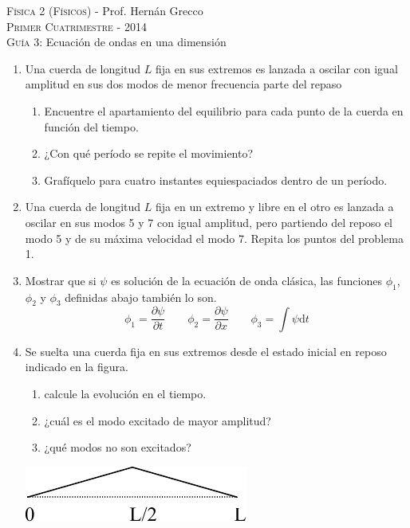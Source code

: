 \documentclass[11pt,spanish,a4paper]{article}
\begin{document}
\begin{center}
	\textsc{\large Física 2 (Físicos)} - Prof. Hernán Grecco\\
	\textsc{\large Primer Cuatrimestre - 2014}\\
	\textsc{\large Guía 3:}	Ecuación de ondas en una dimensión
\end{center}

\begin{enumerate}
\item Una cuerda de longitud \(L\) fija en sus extremos es lanzada a oscilar con igual amplitud en sus dos modos de menor frecuencia parte del repaso
	\begin{enumerate}
		\item Encuentre el apartamiento del equilibrio para cada punto de la cuerda en función del
			tiempo.
		\item ¿Con qué período se repite el movimiento?
		\item Grafíquelo para cuatro instantes equiespaciados dentro de un período.
	\end{enumerate}

\item Una cuerda de longitud \(L\) fija en un extremo y libre en el otro es lanzada a oscilar en sus modos 5 y 7 con igual amplitud, pero partiendo del reposo el modo 5 y de su máxima velocidad el modo 7.
	Repita los puntos del problema 1.

\item Mostrar que si \(\psi\) es solución de la ecuación de onda clásica, las funciones \(\phi_1\), \(\phi_2\) y \(\phi_3\)	definidas abajo también lo son.
	\[
		\phi_1 = \frac{\partial \psi}{\partial t} \qquad \phi_2 = \frac{\partial \psi}{\partial x} \qquad \phi_3 = \int\! \psi \mathrm{d}t
	\]

\item Se suelta una cuerda fija en sus extremos desde el estado inicial en reposo indicado en la figura.
	\begin{enumerate}
		\item calcule la evolución en el tiempo.
		\item ¿cuál es el modo excitado de mayor amplitud?
		\item ¿qué modos no son excitados?
	\end{enumerate}
	\begin{center}
		\includegraphics[width=0.3\linewidth]{g03e04}
	\end{center}


\end{enumerate}
\end{document}
